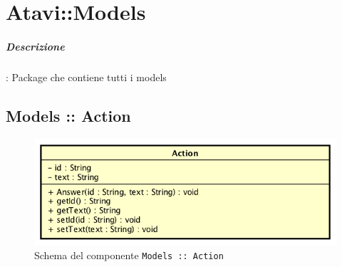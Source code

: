 \documentclass[../ManualeSviluppatore_v1.0.0.tex]{subfiles}
\begin{document}
\section{Atavi::Models}

	\subparagraph{Descrizione}: Package che contiene tutti i models

	      
	\subsection{Models :: Action}
	\begin{figure}[!h]
		\centering
		\includegraphics[scale=0.6]{Architettura/Front-End/Models/Action.png}
		\caption{Schema del componente \texttt{Models :: Action}}
	\end{figure}
\end{document}
